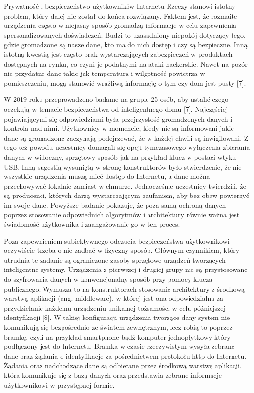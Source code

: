 \documentclass[12pt, twoside, openany]{mwrep}
\begin{document}
Prywatność i bezpieczeństwo użytkowników Internetu Rzeczy stanowi istotny problem, który dalej nie został do końca rozwiązany. Faktem jest, że rozmaite urządzenia często w niejasny sposób gromadzą informacje w celu zapewnienia spersonalizowanych doświadczeń. Budzi to uzasadniony niepokój dotyczący tego, gdzie gromadzone są nasze dane, kto ma do nich dostęp i czy są bezpieczne. Inną istotną kwestią jest często brak wystarczających zabezpieczeń w produktach dostępnych na rynku, co czyni je podatnymi na ataki hackerskie. Nawet na pozór nie przydatne dane takie jak temperatura i wilgotność powietrza w pomieszczeniu, mogą stanowić wrażliwą informację o tym czy dom jest pusty [7].
\par
W 2019 roku przeprowadzono badanie na grupie 25 osób, aby ustalić czego oczekują w temacie bezpieczeństwa od inteligentnego domu [7]. Najczęściej pojawiającymi się odpowiedziami była przejrzystość gromadzonych danych i kontrola nad nimi. Użytkownicy w momencie, kiedy nie są informowani jakie dane są gromadzone zaczynają podejrzewać, że w każdej chwili są inwigilowani. Z tego też powodu uczestnicy domagali się opcji tymczasowego wyłączenia zbierania danych w widoczny, sprzętowy sposób jak na przykład klucz w postaci wtyku USB. Inną sugestią wysuniętą w stronę konstruktorów było stwierdzenie, że nie wszystkie urządzenia muszą mieć dostęp do Internetu, a dane można przechowywać lokalnie zamiast w chmurze. Jednocześnie uczestnicy twierdzili, że są producenci, których darzą wystarczającym zaufaniem, aby bez obaw powierzyć im swoje dane. Powyższe badanie pokazuje, że poza samą ochroną danych poprzez stosowanie odpowiednich algorytmów i architektury równie ważna jest świadomość użytkownika i zaangażowanie go w ten proces.
\par
Poza zapewnieniem subiektywnego odczucia bezpieczeństwa użytkownikowi oczywiście trzeba o nie zadbać w fizyczny sposób. Głównym czynnikiem, który utrudnia te zadanie są ograniczone zasoby sprzętowe urządzeń tworzących inteligentne systemy. Urządzenia z pierwszej i drugiej grupy nie są przystosowane do szyfrowania danych w konwencjonalny sposób przy pomocy klucza publicznego. Wymusza to na konstruktorach stosowanie architektury z środkową warstwą aplikacji (ang. middleware), w której jest ona odpowiedzialna za przydzielanie każdemu urządzeniu unikalnej tożsamości w celu późniejszej identyfikacji [8]. W takiej konfiguracji urządzenia tworzące dany system nie komunikują się bezpośrednio ze światem zewnętrznym, lecz robią to poprzez bramkę, czyli na przykład smartphone bądź komputer jednopłytkowy który podłączony jest do Internetu. Bramka w czasie rzeczywistym wysyła zebrane dane oraz żądania o identyfikacje za pośrednictwem protokołu http do Internetu. Żądania oraz nadchodzące dane są odbierane przez środkową warstwę aplikacji, która komunikuje się z bazą danych oraz przedstawia zebrane informacje użytkownikowi w przystępnej formie. 
\end{document}
